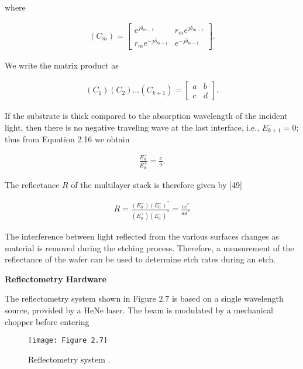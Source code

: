 \noindent where

\begin{align}
	(C_{m}) = \begin{bmatrix} e^{j\delta_{m-1}} & r_{m}e^{j\delta_{m-1}} \\ r_{m}e^{-j\delta_{m-1}} & e^{-j\delta_{m-1}} \end{bmatrix}.
\end{align}

\noindent We write the matrix product as

\begin{align}
	(C_{1})(C_{2})...(C_{k+1})=\begin{bmatrix} a & b \\ c & d \end{bmatrix}.
\end{align}


\noindent If the substrate is thick compared to the absorption wavelength of the incident light, then there is no negative traveling wave at the last interface, i.e., $E_{k+1}^{-} = 0$; thus from Equation 2.16 we obtain


\begin{align}
	\frac{E_{0}^{-}}{E_{0}^{+}} = \frac{c}{a}.
\end{align}

\noindent The reflectance $R$ of the multilayer stack is therefore given by [49]

\begin{align}
	R=\frac{\left( E_{0}^{-}\right)\left(E_{0}^{-}\right)^{*}}{\left(E_{0}^{+}\right)\left(E_{0}^{+}\right)^{*}} = \frac{cc^{*}}{aa^{*}}
\end{align}

The interference between light reflected from the various surfaces changes as material is removed during the etching process. Therefore, a measurement of the reflectance of the
wafer can be used to determine etch rates during an etch.


\noindent\large\bf Reflectometry Hardware


\normalsize\normalfont The reflectometry system shown in Figure 2.7 is based on a single wavelength source, provided by a HeNe laser. The beam is modulated by a mechanical chopper before entering

\begin{figure}[H]
	\centering
	\texttt{[image: Figure 2.7]}
	\bf\caption{ Reflectometry system .}
	\label{fig:2.7}
\end{figure}

